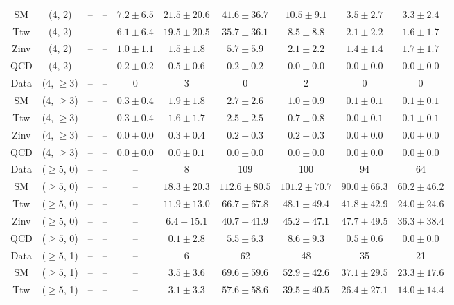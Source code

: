 \begin{table}[h!]
{\begin{tabular}{cccccccccc}
	SM & (4, 2) & -- & -- & $7.2\pm 6.5$ & $21.5\pm 20.6$ & $41.6\pm 36.7$ & $10.5\pm 9.1$ & $3.5\pm 2.7$ & $3.3\pm 2.4$ \\[0.5ex] 
	Ttw & (4, 2) & -- & -- & $6.1\pm 6.4$ & $19.5\pm 20.5$ & $35.7\pm 36.1$ & $8.5\pm 8.8$ & $2.1\pm 2.2$ & $1.6\pm 1.7$ \\[0.5ex] 
	Zinv & (4, 2) & -- & -- & $1.0\pm 1.1$ & $1.5\pm 1.8$ & $5.7\pm 5.9$ & $2.1\pm 2.2$ & $1.4\pm 1.4$ & $1.7\pm 1.7$ \\[0.5ex] 
	QCD & (4, 2) & -- & -- & $0.2\pm 0.2$ & $0.5\pm 0.6$ & $0.2\pm 0.2$ & $0.0\pm 0.0$ & $0.0\pm 0.0$ & $0.0\pm 0.0$ \\[0.5ex] 
	Data & (4, $\ge3$) & -- & -- & 0 & 3 & 0 & 2 & 0 & 0 \\[0.5ex] 
	SM & (4, $\ge3$) & -- & -- & $0.3\pm 0.4$ & $1.9\pm 1.8$ & $2.7\pm 2.6$ & $1.0\pm 0.9$ & $0.1\pm 0.1$ & $0.1\pm 0.1$ \\[0.5ex] 
	Ttw & (4, $\ge3$) & -- & -- & $0.3\pm 0.4$ & $1.6\pm 1.7$ & $2.5\pm 2.5$ & $0.7\pm 0.8$ & $0.0\pm 0.1$ & $0.1\pm 0.1$ \\[0.5ex] 
	Zinv & (4, $\ge3$) & -- & -- & $0.0\pm 0.0$ & $0.3\pm 0.4$ & $0.2\pm 0.3$ & $0.2\pm 0.3$ & $0.0\pm 0.0$ & $0.0\pm 0.0$ \\[0.5ex] 
	QCD & (4, $\ge3$) & -- & -- & $0.0\pm 0.0$ & $0.0\pm 0.1$ & $0.0\pm 0.0$ & $0.0\pm 0.0$ & $0.0\pm 0.0$ & $0.0\pm 0.0$ \\[0.5ex] 
	Data & ($\ge5$, 0) & -- & -- & -- & 8 & 109 & 100 & 94 & 64 \\[0.5ex] 
	SM & ($\ge5$, 0) & -- & -- & -- & $18.3\pm 20.3$ & $112.6\pm 80.5$ & $101.2\pm 70.7$ & $90.0\pm 66.3$ & $60.2\pm 46.2$ \\[0.5ex] 
	Ttw & ($\ge5$, 0) & -- & -- & -- & $11.9\pm 13.0$ & $66.7\pm 67.8$ & $48.1\pm 49.4$ & $41.8\pm 42.9$ & $24.0\pm 24.6$ \\[0.5ex] 
	Zinv & ($\ge5$, 0) & -- & -- & -- & $6.4\pm 15.1$ & $40.7\pm 41.9$ & $45.2\pm 47.1$ & $47.7\pm 49.5$ & $36.3\pm 38.4$ \\[0.5ex] 
	QCD & ($\ge5$, 0) & -- & -- & -- & $0.1\pm 2.8$ & $5.5\pm 6.3$ & $8.6\pm 9.3$ & $0.5\pm 0.6$ & $0.0\pm 0.0$ \\[0.5ex] 
	Data & ($\ge5$, 1) & -- & -- & -- & 6 & 62 & 48 & 35 & 21 \\[0.5ex] 
	SM & ($\ge5$, 1) & -- & -- & -- & $3.5\pm 3.6$ & $69.6\pm 59.6$ & $52.9\pm 42.6$ & $37.1\pm 29.5$ & $23.3\pm 17.6$ \\[0.5ex] 
	Ttw & ($\ge5$, 1) & -- & -- & -- & $3.1\pm 3.3$ & $57.6\pm 58.6$ & $39.5\pm 40.5$ & $26.4\pm 27.1$ & $14.0\pm 14.4$ \\[0.5ex] 

\end{tabular}}
\end{table}
